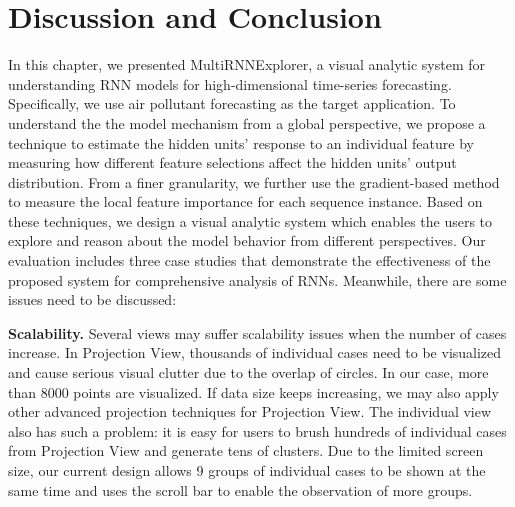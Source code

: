 \section{Discussion and Conclusion}

In this chapter, we presented MultiRNNExplorer, a visual analytic system for understanding RNN models for high-dimensional time-series forecasting.
Specifically, we use air pollutant forecasting as the target application. 
To understand the the model mechanism from a global perspective, we propose a technique to estimate the hidden units' response to an individual feature by measuring how different feature selections affect the hidden units' output distribution. 
From a finer granularity, we further use the gradient-based method to measure the local feature importance for each sequence instance. 
Based on these techniques, we design a visual analytic system which enables the users to explore and reason about the model behavior from different perspectives. 
Our evaluation includes three case studies that demonstrate the effectiveness of the proposed system for comprehensive analysis of RNNs.
Meanwhile, there are some issues need to be discussed:

\textbf{Scalability.}
Several views may suffer scalability issues when the number of cases increase. 
In Projection View, thousands of individual cases need to be visualized and cause serious visual clutter due to the overlap of circles.  
In our case, more than 8000 points are visualized. 
If data size keeps increasing, we may also apply other advanced projection techniques\cite{van2017visual, pezzotti2016hierarchical} for Projection View. 
The individual view also has such a problem: it is easy for users to brush hundreds of individual cases from Projection View and generate tens of clusters. Due to the limited screen size, our current design allows 9 groups of individual cases to be shown at the same time and uses the scroll bar to enable the observation of more groups.

